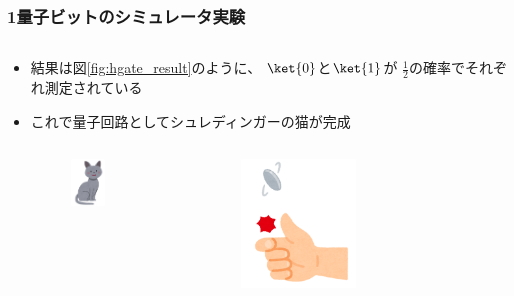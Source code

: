 \begin{frame}
  \frametitle{1量子ビットのシミュレータ実験}

  \begin{columns}
    \begin{column}{0.5\textwidth}
      \begin{itemize}
        \item<+-> 結果は図\ref{fig:hgate_result}のように、
        $\ket{0}$と$\ket{1}$が
        $\frac{1}{2}$の確率でそれぞれ測定されている

        \item<+-> これで量子回路としてシュレディンガーの猫が完成
        \begin{columns}
          \begin{column}{0.4\textwidth}
            \begin{figure}
              \includegraphics[width=0.5\textwidth]{./img/cat_russian_blue.png}
            \end{figure}
          \end{column}
          \begin{column}{0.4\textwidth}
            \begin{figure}
              \includegraphics[width=0.5\textwidth]{./img/coin_toss.png}

\end{figure}
\end{column}
\end{columns}
\end{itemize}
\end{column}
\end{columns}
\end{frame}
